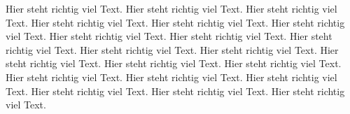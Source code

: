 Hier steht richtig viel Text.
Hier steht richtig viel Text.
Hier steht richtig viel Text.
Hier steht richtig viel Text.
Hier steht richtig viel Text.
Hier steht richtig viel Text.
Hier steht richtig viel Text.
Hier steht richtig viel Text.
Hier steht richtig viel Text.
Hier steht richtig viel Text.
Hier steht richtig viel Text.
Hier steht richtig viel Text.
Hier steht richtig viel Text.
Hier steht richtig viel Text.
Hier steht richtig viel Text.
Hier steht richtig viel Text.
Hier steht richtig viel Text.
Hier steht richtig viel Text.
Hier steht richtig viel Text.
Hier steht richtig viel Text.
